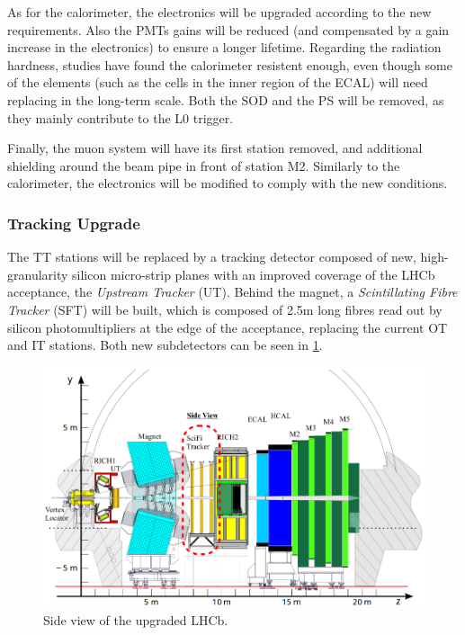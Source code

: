 As for the calorimeter, the electronics will be upgraded according to the new requirements. Also the PMTs gains will be reduced (and compensated by a gain increase in the electronics) to ensure a longer lifetime. Regarding the radiation hardness, studies have found the calorimeter resistent enough, even though some of the elements (such as the cells in the inner region of the ECAL) will need replacing in the long-term scale. Both the SOD and the PS will be removed, as they mainly contribute to the L0 trigger.

Finally, the muon system will have its first station removed, and additional shielding around the beam pipe in front of station M2. Similarly to the calorimeter, the electronics will be modified to comply with the new conditions. 


\subsubsection{Tracking Upgrade} %
The TT stations will be replaced by a tracking detector composed of new, high-granularity silicon micro-strip planes with an improved coverage of the LHCb acceptance, the \textit{Upstream Tracker} (UT). Behind the magnet, a \textit{Scintillating Fibre Tracker} (SFT) will be built, which is composed of 2.5m long fibres read out by silicon photomultipliers at the edge of the acceptance, replacing the current OT and IT stations. Both new subdetectors can be seen in \ref{fig:LHCbUPGRADE}.

\begin{figure} [htb!]
\begin{center}
\includegraphics[scale=0.4]{figs/LHCb_upgrade.png}
\caption{Side view of the upgraded LHCb.\label{fig:LHCbUPGRADE}}
\end{center}
\end{figure}

